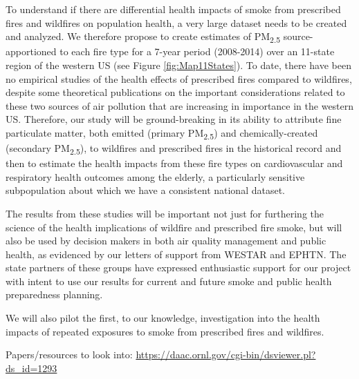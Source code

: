 \documentclass[authoryear]{elsarticle}
\begin{document}
To understand if there are differential health impacts of smoke from prescribed fires and wildfires on population health, a very large dataset needs to be created and analyzed. We therefore propose to create estimates of PM\textsubscript{2.5} source-apportioned to each fire type for a 7-year period (2008-2014) over an 11-state region of the western US (see Figure \ref{fig:Map11States}). To date, there have been no empirical studies of the health effects of prescribed fires compared to wildfires, despite some theoretical publications \citep{Haikerwal2015JAWMA,SchweizerForest2017} 
on the important considerations related to these two sources of air pollution that are increasing in importance in the western US. Therefore, our study will be ground-breaking in its ability to attribute fine particulate matter, both emitted (primary PM\textsubscript{2.5}) and chemically-created (secondary PM\textsubscript{2.5}), to wildfires and prescribed fires in the historical record and then to estimate the health impacts from these fire types on cardiovascular and respiratory health outcomes among the elderly, a particularly sensitive subpopulation about which we have a consistent national dataset. 

The results from these studies will be important not just for furthering the science of the health implications of wildfire and prescribed fire smoke, but will also be used by decision makers in both air quality management and public health, as evidenced by our letters of support from WESTAR and EPHTN. The state partners of these groups have expressed enthusiastic support for our project with intent to use our results for current and future smoke and public health preparedness planning. 

We will also pilot the first, to our knowledge,
investigation into the health impacts of repeated exposures to smoke from prescribed fires and wildfires. 

Papers/resources to look into: \url{https://daac.ornl.gov/cgi-bin/dsviewer.pl?ds_id=1293}


\end{document}
